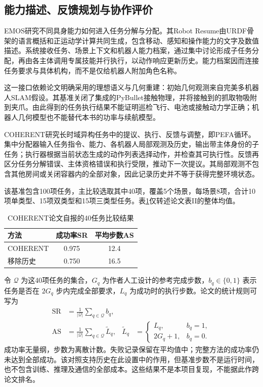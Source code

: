 \subsection{能力描述、反馈规划与协作评价}

EMOS研究不同具身能力如何进入任务分解与分配\cite{EMOS2025}。其Robot Resume由URDF骨架的语言概括和正运动学计算共同生成，包含移动、感知和操作能力的文字及数值描述。系统接收任务、场景上下文和机器人能力档案，通过集中讨论形成子任务分配，再由各主体调用专属技能并行执行，以动作响应更新历史。能力档案因而连接任务要求与具体机构，而不是仅给机器人附加角色名称。

这一接口依赖论文明确采用的理想语义与几何重建：初始几何观测来自完美多机器人SLAM假设。其基准关闭了集成的PyBullet接触物理，并将接触到的抓取物吸附到夹爪。由此得到的任务执行结果不能证明巡检飞行、电池或接触动力学正确；机器人几何模型也不能替代本书的功率与续航模型。

COHERENT研究长时域异构任务中的提议、执行、反馈与调整，即PEFA循环\cite{COHERENT2025}。集中分配器输入任务指令、能力、各机器人局部观测及历史，输出带主体身份的子任务；执行器根据当前状态生成的动作列表选择动作，并检查其可执行性。反馈再区分任务分解错误、主体资格错误和执行受限，推动下一次提议。其局部观测不包含其他房间或关闭容器内的全部对象，因此记录历史并不等于获得完整环境状态。

该基准包含100项任务，主比较选取其中40项，覆盖5个场景，每场景8项，合计10项单类型、15项双类型和15项三类型任务。表\ref{s0310:coherent_results}仅转述论文表II的整体均值。
\begin{table}[htbp]
\centering
\caption{COHERENT论文自报的40任务比较结果}
\label{s0310:coherent_results}
\begin{tabular}{lcc}
\toprule
方法 & 成功率SR & 平均步数AS\\
\midrule
COHERENT & 0.975 & 12.4\\
移除历史 & 0.750 & 16.5\\
\bottomrule
\end{tabular}
\end{table}

令 $\mathcal Q$ 为这40项任务的集合，$G_q$ 为作者人工设计的参考完成步数，$b_q\in\{0,1\}$ 表示任务是否在 $2G_q$ 步内完成全部要求，$L_q$ 为成功时的执行步数。论文的统计规则可写为
\begin{align}
\label{s0310:coherent_metrics}
\mathrm{SR}&=\frac{1}{|\mathcal Q|}\sum_{q\in\mathcal Q}b_q,\\
\mathrm{AS}&=\frac{1}{|\mathcal Q|}\sum_{q\in\mathcal Q}\widetilde L_q,
&\widetilde L_q&=
\begin{cases}
L_q,&b_q=1,\\
2G_q+1,&b_q=0.
\end{cases}
\end{align}
成功率无量纲，步数为离散计数。失败记录保留在平均值中；完整方法的成功率仍未达到全部成功。该对照支持历史在此设置中的作用，但基准步数不是运行时间，也不包含训练、推理及通信的全部成本。这些结果不是本项目复现，不能据此作跨论文排名。

